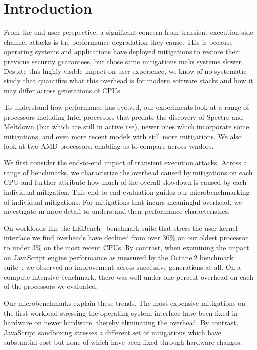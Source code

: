 \section{Introduction}

From the end-user perspective, a significant concern from transient execution side channel attacks is the performance degradation they cause.
This is because operating systems and applications have deployed mitigations to restore their previous security guarantees, but those same mitigations make systems slower.
Despite this highly visible impact on user experience, we know of no systematic study that quantifies what this overhead is for modern software stacks and how it may differ across generations of CPUs.

To understand how performance has evolved, our experiments look at a range of processors including Intel processors that predate the discovery of Spectre and Meltdown (but which are still in active use), newer ones which incorporate some mitigations, and even more recent models with still more mitigations.
We also look at two AMD processors, enabling us to compare across vendors.

We first consider the end-to-end impact of transient execution attacks.
Across a range of benchmarks, we characterize the overhead caused by mitigations on each CPU and further attribute how much of the overall slowdown is caused by each individual mitigation.
This end-to-end evaluation guides our microbenchmarking of individual mitigations.
For mitigations that incurs meaningful overhead, we investigate in more detail to understand their performance characteristics.

On workloads like the LEBench~\cite{ren:lebench} benchmark suite that stress the user-kernel interface we find overheads have declined from over 30\% on our oldest processor to under 3\% on the most recent CPUs.
By contrast, when examining the impact on JavaScript engine performance as measured by the Octane 2 benchmark suite~\cite{google:octane2}, we observed no improvement across successive generations at all.
On a compute intensive benchmark, there was well under one percent overhead on each of the processors we evaluated.

Our microbenchmarks explain these trends.
The most expensive mitigations on the first workload stressing the operating system interface have been fixed in hardware on newer hardware, thereby eliminating the overhead.
By contrast, JavaScript sandboxing stresses a different set of mitigations which
have substantial cost but none of which have been fixed through hardware changes.

